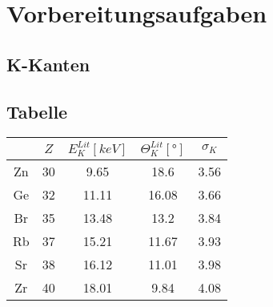 \section{Vorbereitungsaufgaben}
\label{sec:Vorbereitungsaufgaben}

\subsection{K-Kanten}


\subsection{Tabelle}
\begin{table}
    \centering
    \begin{tabular}{c c c c c|}
        \toprule
        {} & {$Z$} & {$E_{K}^{Lit}\left[\unit{keV}\right]$\cite{energie_k}} & {$\Theta_{K}^{Lit}\left[\unit{°}\right]$} & {$\sigma_{K}$}\\
        \midrule
        Zn & 30 & 9.65 & 18.6 & 3.56 \\
        Ge & 32 & 11.11 & 16.08 & 3.66 \\
        Br & 35 & 13.48 & 13.2 & 3.84 \\
        Rb & 37 & 15.21 & 11.67 & 3.93 \\
        Sr & 38 & 16.12 & 11.01 & 3.98 \\
        Zr & 40 & 18.01 & 9.84 & 4.08 \\
        \bottomrule
    \end{tabular}
\end{table}